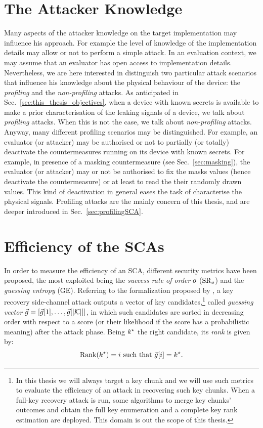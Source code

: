 \section{The Attacker Knowledge}
Many aspects of the attacker knowledge on the target implementation may influence his approach. For example the level of knowledge of the implementation details may allow or not to perform a simple attack. In an evaluation context, we may assume that an evaluator has open access to implementation details. Nevertheless, we are here interested in distinguish two particular attack scenarios that influence his knowledge about the physical behaviour of the device: the \emph{profiling} and the \emph{non-profiling} attacks.
As anticipated in Sec.~\ref{sec:this_thesis_objectives}, when a device with known secrets is available to make a prior characterisation of the leaking signals of a device, we talk about \emph{profiling} attacks. When this is not the case, we talk about \emph{non-profiling} attacks. Anyway, many different profiling scenarios may be distinguished. For example, an evaluator (or attacker) may be authorised or not to partially (or totally) deactivate the countermeasures running on its device with known secrets. For example, in presence of a masking countermeasure (see Sec.~\ref{sec:masking}), the evaluator (or attacker) may or not be authorised to fix the masks values (hence deactivate the countermeasure) or at least to read the their randomly drawn values. This kind of deactivation in general eases the task of characterise the physical signals. Profiling attacks are the mainly concern of this thesis, and are deeper introduced in Sec.~\ref{sec:profilingSCA}. \\


\section{Efficiency of the SCAs}\label{sec:metrics}
In order to measure the efficiency of an SCA, different security metrics have been proposed, the most exploited being the \emph{success rate of order} $o$ ($\mathrm{SR}_o$) and the \emph{guessing entropy} (GE). Referring to the formalization proposed by \cite{unifiedFramework}, a key recovery side-channel attack outputs a vector of key candidates,\footnote{In this thesis we will always target a key chunk and we will use such metrics to evaluate the efficiency of an attack in recovering such key chunks. When a full-key recovery attack is run, some algorithms to merge key chunks' outcomes and obtain the full key enumeration and a complete key rank estimation are deployed. This domain is out the scope of this thesis.} called {\em guessing vector} $\vec{g} = \left[\vec{g}[1], \dots, \vec{g}[{\lvert \mathcal{K} \rvert}]\right]$, in which such candidates are sorted in decreasing order with respect to a score (or their likelihood if the score has a probabilistic meaning) after the attack phase. Being $k^\star$ the right candidate, its \emph{rank} is given by:
\begin{equation}
\mathrm{Rank}(k^\star) = i \mbox{ such that } \vec{g}[i] = k^\star \mbox{.}
\end{equation}

